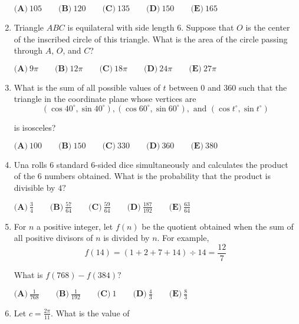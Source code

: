 \documentclass{article}
\begin{document}
\begin{enumerate}[label=\arabic*., itemsep=0.5em]
$\textbf{(A)} \: 105 \qquad\textbf{(B)} \: 120 \qquad\textbf{(C)} \: 135 \qquad\textbf{(D)} \: 150 \qquad\textbf{(E)} \: 165$\par \vspace{0.5em}\item Triangle $ABC$ is equilateral with side length $6$. Suppose that $O$ is the center of the inscribed
circle of this triangle. What is the area of the circle passing through $A$, $O$, and $C$?

$\textbf{(A)} \: 9\pi \qquad\textbf{(B)} \: 12\pi \qquad\textbf{(C)} \: 18\pi \qquad\textbf{(D)} \: 24\pi \qquad\textbf{(E)} \: 27\pi$\par \vspace{0.5em}\item What is the sum of all possible values of $t$ between $0$ and $360$ such that the triangle in the coordinate plane whose vertices are 
\begin{equation*}
(\cos 40^\circ,\sin 40^\circ), (\cos 60^\circ,\sin 60^\circ), \text{ and } (\cos t^\circ,\sin t^\circ)
\end{equation*}

is isosceles? 

$\textbf{(A)} \: 100 \qquad\textbf{(B)} \: 150 \qquad\textbf{(C)} \: 330 \qquad\textbf{(D)} \: 360 \qquad\textbf{(E)} \: 380$\par \vspace{0.5em}\item Una rolls $6$ standard $6$-sided dice simultaneously and calculates the product of the $6{ }$ numbers obtained. What is the probability that the product is divisible by $4?$

$\textbf{(A)}\: \frac34\qquad\textbf{(B)} \: \frac{57}{64}\qquad\textbf{(C)} \: \frac{59}{64}\qquad\textbf{(D)} \: \frac{187}{192}\qquad\textbf{(E)} \: \frac{63}{64}$\par \vspace{0.5em}\item For $n$ a positive integer, let $f(n)$ be the quotient obtained when the sum of all positive divisors of $n$ is divided by $n.$ For example, 
\begin{equation*}
f(14)=(1+2+7+14)\div 14=\frac{12}{7}
\end{equation*}

What is $f(768)-f(384)?$

$\textbf{(A)}\ \frac{1}{768} \qquad\textbf{(B)}\ \frac{1}{192} \qquad\textbf{(C)}\ 1 \qquad\textbf{(D)}\
\frac{4}{3} \qquad\textbf{(E)}\ \frac{8}{3}$\par \vspace{0.5em}\item Let $c = \frac{2\pi}{11}.$ What is the value of


\end{enumerate}
\end{document}
